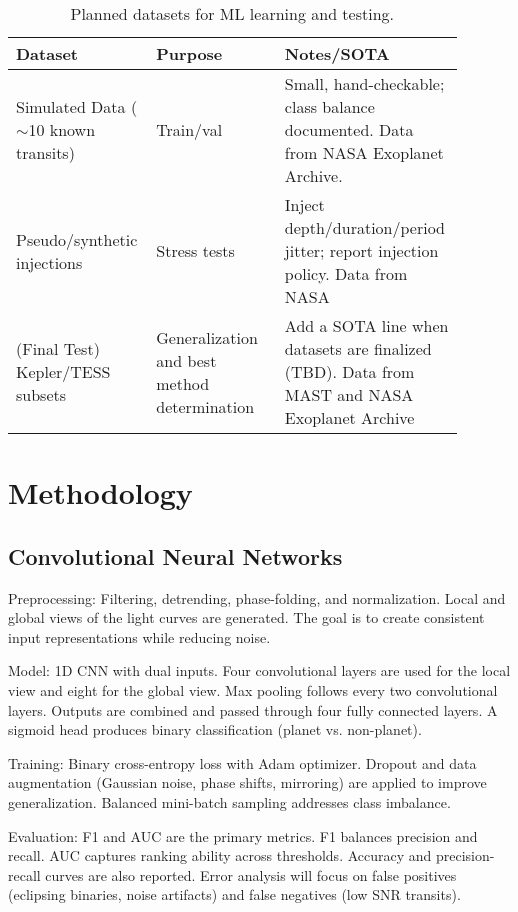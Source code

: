 \documentclass[letterpaper]{article} %
\begin{document}
\begin{table}[t]
\centering
\begin{tabular}{p{0.28\linewidth} p{0.28\linewidth} p{0.33\linewidth}}
\hline
\textbf{Dataset} & \textbf{Purpose} & \textbf{Notes/SOTA} \\ \hline
Simulated Data ($\sim$10 known transits) & Train/val & Small, hand-checkable; class balance documented. Data from NASA Exoplanet Archive. \\
Pseudo/synthetic injections & Stress tests & Inject depth/duration/period jitter; report injection policy. Data from NASA \\
(Final Test) Kepler/TESS subsets & Generalization and best method determination & Add a SOTA line when datasets are finalized (TBD). Data from MAST and NASA Exoplanet Archive \\ \hline
\end{tabular}
\caption{{Planned datasets for ML learning and testing.}}
\label{{tab:datasets}}
\end{table}

\section*{Methodology}
\subsection*{Convolutional Neural Networks}
Preprocessing: Filtering, detrending, phase-folding, and normalization. Local and global views of the light curves are generated. The goal is to create consistent input representations while reducing noise.

Model: 1D CNN with dual inputs. Four convolutional layers are used for the local view and eight for the global view. Max pooling follows every two convolutional layers. Outputs are combined and passed through four fully connected layers. A sigmoid head produces binary classification (planet vs. non-planet).

Training: Binary cross-entropy loss with Adam optimizer. Dropout and data augmentation (Gaussian noise, phase shifts, mirroring) are applied to improve generalization. Balanced mini-batch sampling addresses class imbalance.

Evaluation: F1 and AUC are the primary metrics. F1 balances precision and recall. AUC captures ranking ability across thresholds. Accuracy and precision-recall curves are also reported. Error analysis will focus on false positives (eclipsing binaries, noise artifacts) and false negatives (low SNR transits).
\end{document}
